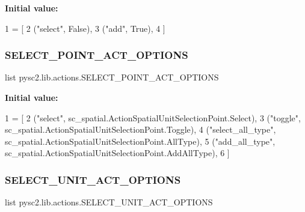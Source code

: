 {\bfseries Initial value\+:}
\begin{DoxyCode}
1 =  [
2     (\textcolor{stringliteral}{"select"}, \textcolor{keyword}{False}),
3     (\textcolor{stringliteral}{"add"}, \textcolor{keyword}{True}),
4 ]
\end{DoxyCode}
\mbox{\label{namespacepysc2_1_1lib_1_1actions_a5958e998483a63351edc01bc714a9c6c}} 
\subsubsection{\texorpdfstring{S\+E\+L\+E\+C\+T\+\_\+\+P\+O\+I\+N\+T\+\_\+\+A\+C\+T\+\_\+\+O\+P\+T\+I\+O\+NS}{SELECT\_POINT\_ACT\_OPTIONS}}
{\footnotesize\ttfamily list pysc2.\+lib.\+actions.\+S\+E\+L\+E\+C\+T\+\_\+\+P\+O\+I\+N\+T\+\_\+\+A\+C\+T\+\_\+\+O\+P\+T\+I\+O\+NS}

{\bfseries Initial value\+:}
\begin{DoxyCode}
1 =  [
2     (\textcolor{stringliteral}{"select"}, sc\_spatial.ActionSpatialUnitSelectionPoint.Select),
3     (\textcolor{stringliteral}{"toggle"}, sc\_spatial.ActionSpatialUnitSelectionPoint.Toggle),
4     (\textcolor{stringliteral}{"select\_all\_type"}, sc\_spatial.ActionSpatialUnitSelectionPoint.AllType),
5     (\textcolor{stringliteral}{"add\_all\_type"}, sc\_spatial.ActionSpatialUnitSelectionPoint.AddAllType),
6 ]
\end{DoxyCode}
\mbox{\label{namespacepysc2_1_1lib_1_1actions_a2ca5baeefd2b48c36e1153ddc70589bf}} 
\subsubsection{\texorpdfstring{S\+E\+L\+E\+C\+T\+\_\+\+U\+N\+I\+T\+\_\+\+A\+C\+T\+\_\+\+O\+P\+T\+I\+O\+NS}{SELECT\_UNIT\_ACT\_OPTIONS}}
{\footnotesize\ttfamily list pysc2.\+lib.\+actions.\+S\+E\+L\+E\+C\+T\+\_\+\+U\+N\+I\+T\+\_\+\+A\+C\+T\+\_\+\+O\+P\+T\+I\+O\+NS}

